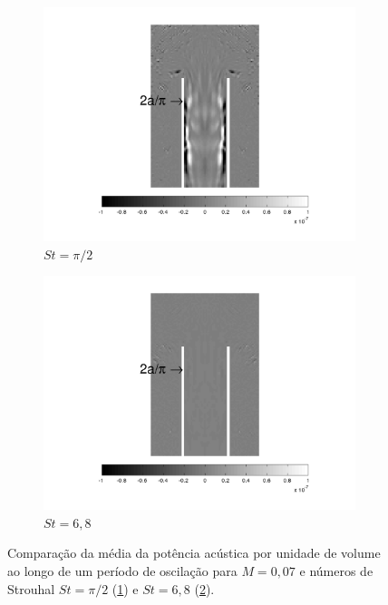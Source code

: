 \begin{figure}[ht!]
\begin{subfigure}{0.5\textwidth}
  \centering
  \includegraphics[width=1.1\linewidth]{figuras/max_007_media.png}
  \caption{$St = \pi/2$}
  \label{fig:comparacao_007_max}
\end{subfigure}%
\begin{subfigure}{0.5\textwidth}
  \centering
  \includegraphics[width=1.1\linewidth]{figuras/min_007_media.png}
  \caption{$St = 6,8$}
  \label{fig:comparacao_007_min}
\end{subfigure}
\caption[Comparação da média da potência acústica por unidade de volume ao longo de um período de oscilação para $M = 0,07$ e números de Strouhal $St = \pi/2$ e $St = 6,8$.]{Comparação da média da potência acústica por unidade de volume ao longo de um período de oscilação para $M = 0,07$ e números de Strouhal $St = \pi/2$ (\ref{fig:comparacao_007_max}) e $St = 6,8$ (\ref{fig:comparacao_007_min}).}
\label{fig:comparacao_007_media}
\end{figure}

